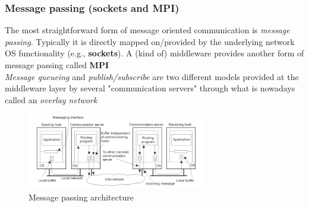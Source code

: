 \documentclass[10pt,a4paper]{article}
\begin{document}
\subsubsection{Message passing (sockets and MPI)}
The most straightforward form of message oriented communication is \textit{message passing}. Typically it is directly mapped on/provided by the underlying network OS functionality (e.g., \textbf{sockets}). A (kind of) middleware provides another form of message passing called \textbf{MPI} \\
\textit{Message queueing} and \textit{publish/subscribe} are two different models provided at the middleware layer by several "communication servers" through what is nowadays called an \textit{overlay network}
 \begin{figure}[h!]
 \hfill \includegraphics[width=220pt]{images/message-model.png}\hspace*{\fill}
 \caption{Message passing architecture}
  \label{fig:message-model}
\end{figure}
\end{document}
